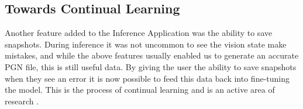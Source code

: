 \subsection{Towards Continual Learning}
Another feature added to the Inference Application was the ability to save snapshots.  During inference it was not uncommon to see the vision state make mistakes,
and while the above features usually enabled us to generate an accurate PGN file, this is still useful data.
By giving the user the ability to save snapshots when they see an error it is now possible to feed this data back into fine-tuning the model.  This is the process of 
continual learning and is an active area of research \cite{delange2021continual}.